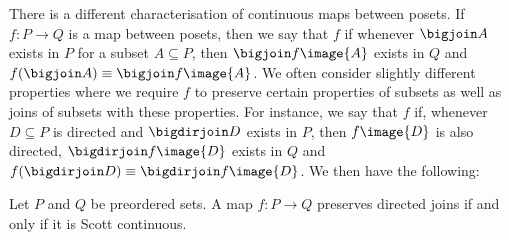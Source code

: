 There is a different characterisation of continuous maps between posets. If $f \colon P \to Q$ is a map between posets, then we say that $f$  if whenever $\bigjoin A$ exists in $P$ for a subset $A \subseteq P$, then $\bigjoin f\image{A}$ exists in $Q$ and $f(\bigjoin A) \equiv \bigjoin f\image{A}$. We often consider slightly different properties where we require $f$ to preserve certain properties of subsets as well as joins of subsets with these properties. For instance, we say that $f$  if, whenever $D \subseteq P$ is directed and $\bigdirjoin D$ exists in $P$, then $f\image{D}$ is also directed, $\bigdirjoin f\image{D}$ exists in $Q$ and $f(\bigdirjoin D) \equiv \bigdirjoin f\image{D}$. We then have the following:




\begin{proposition}
    \label{prop:continuous-vs-Scott-continuous}
    Let $P$ and $Q$ be preordered sets. A map $f \colon P \to Q$ preserves directed joins if and only if it is Scott continuous.
\end{proposition}

